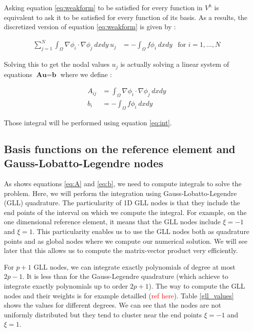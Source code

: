 Asking equation \ref{eq:weakform} to be satisfied for every function in $V^h$ is equivalent to ask it to be satisfied for every function of its basis. As a results, the discretized version of equation \ref{eq:weakform} is given by : 

\begin{align}
\sum_{j = 1}^N \int_\Omega \nabla \phi_i \cdot \nabla \phi_j \:dxdy \: u_j &= -\int_\Omega f\phi_i \:dxdy &\text{for $i=1,...,N$} 
\end{align}

Solving this to get the nodal values $u_j$ is actually solving a linear system of equations $\textbf{Au}=\textbf{b}$ where we define : 

\begin{align}
A_{ij} &= \int_\Omega \nabla \phi_i \cdot \nabla \phi_j \:dxdy \label{eq:A}\\
b_i &= -\int_\Omega f\phi_i \:dxdy \label{eq:b}
\end{align}

Those integral will be performed using equation \ref{eq:int}.

\subsection{Basis functions on the reference element and Gauss-Lobatto-Legendre nodes}

As shows equations \ref{eq:A} and \ref{eq:b}, we need to compute integrals to solve the problem. Here, we will perform the integration using Gauss-Lobatto-Legendre (GLL) quadrature. The particularity of 1D GLL nodes is that they include the end points of the interval on which we compute the integral. For example, on the one dimensional reference element, it means that the GLL nodes include $\xi = -1$ and $\xi=1$. This particularity enables us to use the GLL nodes both as quadrature points and as global nodes where we compute our numerical solution. We will see later that this allows us to compute the matrix-vector product very efficiently. 

For $p+1$ GLL nodes, we can integrate exactly polynomials of degree at most $2p-1$. It is less than for the Gauss-Legendre quadrature (which achieve to integrate exactly polynomials up to order $2p+1$). The way to compute the GLL nodes and their weights is for example detailled (\textcolor{red}{ref here}). Table \ref{gll_values} shows the values for different degrees. We can see that the nodes are not uniformly distributed but they tend to cluster near the end points $\xi = -1$ and $\xi=1$.

